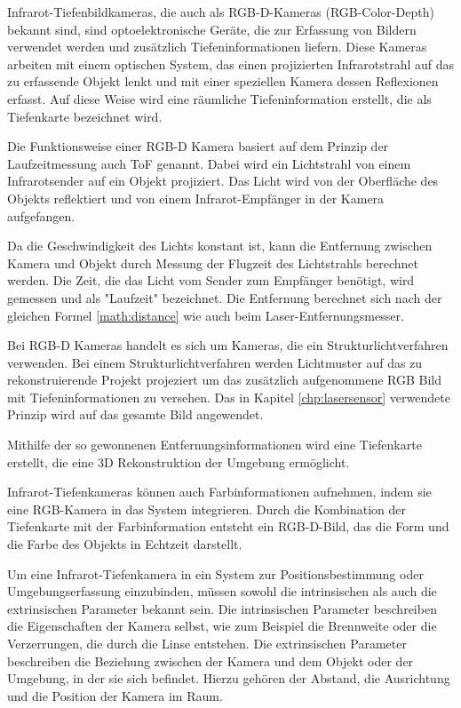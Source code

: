     Infrarot-Tiefenbildkameras, die auch als RGB-D-Kameras (RGB-Color-Depth) bekannt sind, sind optoelektronische Geräte, die zur Erfassung von Bildern verwendet werden und zusätzlich Tiefeninformationen liefern. Diese Kameras arbeiten mit einem optischen System, das einen projizierten Infrarotstrahl auf das zu erfassende Objekt lenkt und mit einer speziellen Kamera dessen Reflexionen erfasst. Auf diese Weise wird eine räumliche Tiefeninformation erstellt, die als Tiefenkarte bezeichnet wird.

    Die Funktionsweise einer \ac{RGB-D} Kamera basiert auf dem Prinzip der Laufzeitmessung auch \ac{ToF} genannt.  Dabei wird ein Lichtstrahl von einem Infrarotsender auf ein Objekt projiziert. Das Licht wird von der Oberfläche des Objekts reflektiert und von einem Infrarot-Empfänger in der Kamera aufgefangen.
    
    Da die Geschwindigkeit des Lichts konstant ist, kann die Entfernung zwischen Kamera und Objekt durch Messung der Flugzeit des Lichtstrahls berechnet werden.
    Die Zeit, die das Licht vom Sender zum Empfänger benötigt, wird gemessen und als "Laufzeit" bezeichnet.
    Die Entfernung berechnet sich nach der gleichen Formel \ref{math:distance} wie auch beim Laser-Entfernungsmesser. 


    Bei \ac{RGB-D} Kameras handelt es sich um Kameras, die ein Strukturlichtverfahren verwenden.
    Bei einem Strukturlichtverfahren werden Lichtmuster auf das zu rekonstruierende Projekt projeziert um das zusätzlich aufgenommene RGB Bild mit Tiefeninformationen zu versehen. Das in Kapitel \ref{chp:lasersensor} verwendete Prinzip wird auf das gesamte Bild angewendet. 
    
    Mithilfe der so gewonnenen Entfernungsinformationen wird eine Tiefenkarte erstellt, die eine 3D Rekonstruktion der Umgebung ermöglicht.

    
    
   Infrarot-Tiefenkameras können auch Farbinformationen aufnehmen, indem sie eine RGB-Kamera in das System integrieren. Durch die Kombination der Tiefenkarte mit der Farbinformation entsteht ein RGB-D-Bild, das die Form und die Farbe des Objekts in Echtzeit darstellt.

    Um eine Infrarot-Tiefenkamera in ein System zur Positionsbestimmung oder Umgebungserfassung einzubinden, müssen sowohl die intrinsischen als auch die extrinsischen Parameter bekannt sein. Die intrinsischen Parameter beschreiben die Eigenschaften der Kamera selbst, wie zum Beispiel die Brennweite oder die Verzerrungen, die durch die Linse entstehen. Die extrinsischen Parameter beschreiben die Beziehung zwischen der Kamera und dem Objekt oder der Umgebung, in der sie sich befindet. Hierzu gehören der Abstand, die Ausrichtung und die Position der Kamera im Raum.

